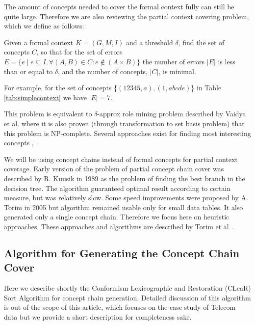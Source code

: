 \documentclass[acmconf,authordraft]{acmart}
\begin{document}
The amount of concepts needed to cover the formal context fully can still be quite large. Therefore we are also reviewing the partial context covering problem, which we define as follows:

\begin{definition}
\label{def_errors}

Given a formal context $ K = (G, M, I)$ and a threshold $\delta$, find the set of concepts $C$, so that for the set of errors $E = \{e \mid e \subseteq I, \forall (A, B) \in C: e \notin (A \times B)  \}$ the number of errors $|E|$ is less than or equal to $\delta$, and the number of concepts, $|C|$, is minimal.

\end{definition}

For example, for the set of concepts \{${(12345, a), (1, abcde)}$\} in Table \ref{tab:simplecontext}  we have $|E|=7$.

This problem is equivalent to $\delta$-approx role mining problem described by Vaidya et al. \cite{vaidya_role_2007} where it is also proven (through transformation to set basis problem) that this problem is NP-complete. Several approaches exist for finding most interesting concepts \cite{kuznetsov_concept_2015}, \cite{kuznetsov_stability_2007}.

We will be using concept chains instead of formal concepts for partial context coverage. Early version of the problem of partial concept chain cover was described by R. Kuusik in 1989 \cite{kuusik_application_1989} as the problem of finding the best branch in the decision tree. The algorithm guaranteed optimal result according to certain measure, but was relatively slow. Some speed improvements were proposed by A. Torim in 2005 \cite{torim_describing_2005} but algorithm remained usable only for small data tables. It also generated only a single concept chain. Therefore we focus here on heuristic approaches. These approaches and algorithms are described by Torim et al \cite{torim_covering_2019}.


\subsection{Algorithm for Generating the Concept Chain Cover}

Here we describe shortly the Conformism Lexicographic and Restoration (CLeaR) Sort Algorithm for concept chain generation. Detailed discussion of this algorithm is out of the scope of this article, which focuses on the case study of Telecom data but we provide a short description for completeness sake.
\end{document}
